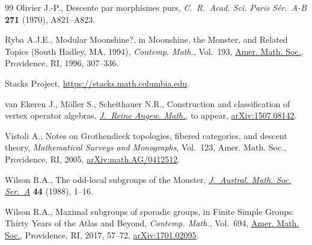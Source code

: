 \documentclass[11pt]{article}
\theoremstyle{definition}
\begin{document}
\begin{thebibliography}{99}
Olivier J.-P., Descente par morphismes purs, \textit{C.~R.~Acad. Sci. Paris
 S\'{e}r.~A-B} \textbf{271} (1970), A821--A823.

Ryba A.J.E., Modular {M}oonshine?, in Moonshine, the {M}onster, and Related
 Topics ({S}outh {H}adley, {MA}, 1994), \textit{Contemp. Math.}, Vol.~193,
 \href{https://doi.org/10.1090/conm/193/02378}{Amer. Math. Soc.}, Providence, RI, 1996, 307--336.

Stacks Project, \url{https://stacks.math.columbia.edu}.

van Ekeren J., M\"oller S., Scheithauer N.R., Construction and classification
 of vertex operator algebras, \href{https://doi.org/10.1515/crelle-2017-0046}{\textit{J.~Reine Angew. Math.}}, {t}o appear,
 \href{https://arxiv.org/abs/1507.08142}{arXiv:1507.08142}.

Vistoli A., Notes on Grothendieck topologies, fibered categories, and descent
 theory, \textit{Mathematical Surveys and Monographs}, Vol.~123, Amer. Math.
 Soc., Providence, RI, 2005, \href{https://arxiv.org/abs/math.AG/0412512}{arXiv:math.AG/0412512}.

Wilson R.A., The odd-local subgroups of the {M}onster, \href{https://doi.org/10.1017/S1446788700031323}{\textit{J.~Austral.
 Math. Soc. Ser.~A}} \textbf{44} (1988), 1--16.

Wilson R.A., Maximal subgroups of sporadic groups, in Finite Simple Groups:
 Thirty Years of the Atlas and Beyond, \textit{Contemp. Math.}, Vol.~694,
 \href{https://doi.org/10.1090/conm/694/13974}{Amer. Math. Soc.}, Providence, RI, 2017, 57--72, \href{https://arxiv.org/abs/1701.02095}{arXiv:1701.02095}.

\end{thebibliography}
\end{document}
